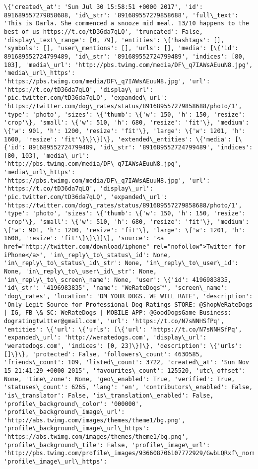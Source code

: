 \documentclass[11pt]{article}
\begin{document}
\begin{Verbatim}[commandchars=\\\{\}]
\{'created\_at': 'Sun Jul 30 15:58:51 +0000 2017', 'id': 891689557279858688, 'id\_str': '891689557279858688', 'full\_text': 'This is Darla. She commenced a snooze mid meal. 13/10 happens to the best of us https://t.co/tD36da7qLQ', 'truncated': False, 'display\_text\_range': [0, 79], 'entities': \{'hashtags': [], 'symbols': [], 'user\_mentions': [], 'urls': [], 'media': [\{'id': 891689552724799489, 'id\_str': '891689552724799489', 'indices': [80, 103], 'media\_url': 'http://pbs.twimg.com/media/DF\_q7IAWsAEuuN8.jpg', 'media\_url\_https': 'https://pbs.twimg.com/media/DF\_q7IAWsAEuuN8.jpg', 'url': 'https://t.co/tD36da7qLQ', 'display\_url': 'pic.twitter.com/tD36da7qLQ', 'expanded\_url': 'https://twitter.com/dog\_rates/status/891689557279858688/photo/1', 'type': 'photo', 'sizes': \{'thumb': \{'w': 150, 'h': 150, 'resize': 'crop'\}, 'small': \{'w': 510, 'h': 680, 'resize': 'fit'\}, 'medium': \{'w': 901, 'h': 1200, 'resize': 'fit'\}, 'large': \{'w': 1201, 'h': 1600, 'resize': 'fit'\}\}\}]\}, 'extended\_entities': \{'media': [\{'id': 891689552724799489, 'id\_str': '891689552724799489', 'indices': [80, 103], 'media\_url': 'http://pbs.twimg.com/media/DF\_q7IAWsAEuuN8.jpg', 'media\_url\_https': 'https://pbs.twimg.com/media/DF\_q7IAWsAEuuN8.jpg', 'url': 'https://t.co/tD36da7qLQ', 'display\_url': 'pic.twitter.com/tD36da7qLQ', 'expanded\_url': 'https://twitter.com/dog\_rates/status/891689557279858688/photo/1', 'type': 'photo', 'sizes': \{'thumb': \{'w': 150, 'h': 150, 'resize': 'crop'\}, 'small': \{'w': 510, 'h': 680, 'resize': 'fit'\}, 'medium': \{'w': 901, 'h': 1200, 'resize': 'fit'\}, 'large': \{'w': 1201, 'h': 1600, 'resize': 'fit'\}\}\}]\}, 'source': '<a href="http://twitter.com/download/iphone" rel="nofollow">Twitter for iPhone</a>', 'in\_reply\_to\_status\_id': None, 'in\_reply\_to\_status\_id\_str': None, 'in\_reply\_to\_user\_id': None, 'in\_reply\_to\_user\_id\_str': None, 'in\_reply\_to\_screen\_name': None, 'user': \{'id': 4196983835, 'id\_str': '4196983835', 'name': 'WeRateDogs™', 'screen\_name': 'dog\_rates', 'location': 'DM YOUR DOGS. WE WILL RATE', 'description': 'Only Legit Source for Professional Dog Ratings STORE: @ShopWeRateDogs | IG, FB \& SC: WeRateDogs | MOBILE APP: @GoodDogsGame Business: dogratingtwitter@gmail.com', 'url': 'https://t.co/N7sNNHSfPq', 'entities': \{'url': \{'urls': [\{'url': 'https://t.co/N7sNNHSfPq', 'expanded\_url': 'http://weratedogs.com', 'display\_url': 'weratedogs.com', 'indices': [0, 23]\}]\}, 'description': \{'urls': []\}\}, 'protected': False, 'followers\_count': 4630585, 'friends\_count': 109, 'listed\_count': 3722, 'created\_at': 'Sun Nov 15 21:41:29 +0000 2015', 'favourites\_count': 125520, 'utc\_offset': None, 'time\_zone': None, 'geo\_enabled': True, 'verified': True, 'statuses\_count': 6265, 'lang': 'en', 'contributors\_enabled': False, 'is\_translator': False, 'is\_translation\_enabled': False, 'profile\_background\_color': '000000', 'profile\_background\_image\_url': 'http://abs.twimg.com/images/themes/theme1/bg.png', 'profile\_background\_image\_url\_https': 'https://abs.twimg.com/images/themes/theme1/bg.png', 'profile\_background\_tile': False, 'profile\_image\_url': 'http://pbs.twimg.com/profile\_images/936608706107772929/GwbLQRxf\_normal.jpg', 'profile\_image\_url\_https': 
\end{Verbatim}
\end{document}
